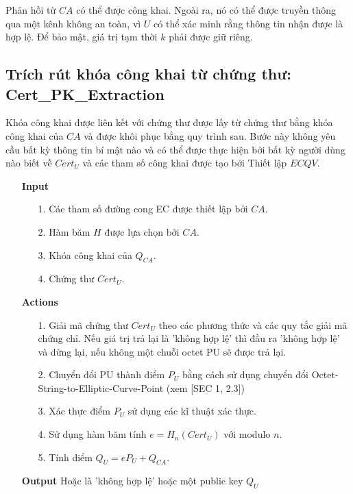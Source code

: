 \documentclass[a4paper,12pt]{report}
\begin{document}
Phản hồi từ $CA$ có thể được công khai. Ngoài ra, nó có thể được truyền thông qua một kênh không an toàn, vì $U$ có thể xác minh rằng thông tin nhận được là hợp lệ. Để bảo mật, giá trị tạm thời $k$ phải được giữ riêng.

\subsection{Trích rút khóa công khai từ chứng thư: Cert\_PK\_Extraction}
Khóa công khai được liên kết với chứng thư được lấy từ chứng thư bằng khóa công khai của $CA$ và được khôi phục bằng quy trình sau. Bước này không yêu cầu bất kỳ thông tin bí mật nào và có thể được thực hiện bởi bất kỳ người dùng nào biết về $Cert_U$ và các tham số công khai được tạo bởi Thiết lập $ECQV$.
\begin{itemize}
\item[] \textbf{Input}
\begin{itemize}
\item[1. ] Các tham số đường cong EC được thiết lập bởi $CA$.
\item[2. ] Hàm băm $H$ được lựa chọn bởi $CA$.
\item[3. ] Khóa công khai của $Q_{CA}$.
\item[4. ] Chứng thư $Cert_U$.
\end{itemize}
\item[] \textbf{Actions}
\begin{itemize}
\item[1. ] Giải mã chứng thư $Cert_U$ theo các phương thức và các quy tắc giải mã chứng chỉ. Nếu giá trị trả lại là 'không hợp lệ' thì đầu ra 'không hợp lệ' và dừng lại, nếu không một chuỗi octet PU sẽ được trả lại.
\item[2. ] Chuyển đổi PU thành điểm $P_U$ bằng cách sử dụng chuyển đổi Octet-String-to-Elliptic-Curve-Point (xem [SEC 1, 2.3])
\item[3. ] Xác thực điểm $P_U$ sử dụng các kĩ thuật xác thực.
\item[4. ] Sử dụng hàm băm tính $e = H_n(Cert_U)$ với modulo $n$.
\item[5. ] Tính điểm $Q_U = eP_U + Q_{CA}$.
\end{itemize}
\item[] \textbf{Output} Hoặc là 'không hợp lệ' hoặc một public key $Q_U$
\end{itemize}
\end{document}
